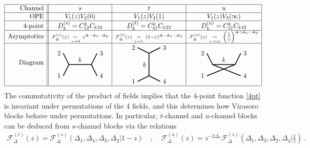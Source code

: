 \documentclass[12pt, a4paper]{article}
\begin{document}
\begin{align}
 \begin{array}{|r||c|c|c|}
  \hline 
  \text{Channel} & s & t & u
  \\ \hline
  \text{OPE} & V_1(z)V_2(0) & V_1(z)V_4(1) & V_1(z)V_3(\infty)
  \\ \hline 
  \text{4-point} & D^{(s)}_k = C_{12}^k C_{k34} & D^{(t)}_k = C_{41}^k C_{k23} & D^{(u)}_k = C_{31}^k C_{k42}
\\ \hline 
  \text{Asymptotics} & {\scriptstyle \mathcal{F}^{(s)}_{\Delta}(z)\ \underset{z\to 0}{\sim}\ z^{\Delta-\Delta_1-\Delta_2}} & {\scriptstyle\mathcal{F}^{(t)}_{\Delta}(z)\ \underset{z\to 1}{\sim}\ (1-z)^{\Delta-\Delta_1-\Delta_4}}
  & {\scriptstyle\mathcal{F}^{(u)}_\Delta(z)\  \underset{z\to \infty}{\sim}\ \left(\tfrac{1}{z}\right)^{\Delta+\Delta_1-\Delta_3}}
  \\
  \hline 
\text{Diagram} & 
\begin{tikzpicture}[baseline=(current  bounding  box.center), very thick, scale = .3]
\draw (-1,2) node [left] {$2$} -- (0,0) -- node [above] {$k$} (4,0) -- (5,2) node [right] {$3$};
\draw (-1,-2) node [left] {$1$} -- (0,0);
\draw (4,0) -- (5,-2) node [right] {$4$};
\end{tikzpicture}
& 
\begin{tikzpicture}[baseline=(current  bounding  box.center), very thick, scale = .3]
 \draw (-2,3) node [left] {$2$} -- (0,2) -- node [left] {$k$} (0,-2) -- (-2, -3) node [left] {$1$};
\draw (0,2) -- (2,3) node [right] {$3$};
\draw (0,-2) -- (2, -3) node [right] {$4$};
\end{tikzpicture}
& 
\begin{tikzpicture}[baseline=(current  bounding  box.center), very thick, scale = .3]
\draw (-1,2) node [left] {$2$} -- (0,0) -- node [above] {$k$} (4,0) -- (5,2) node [right] {$3$};
\draw (-1,-2) node [left] {$1$} -- (4,0);
\draw (0,0) -- (5,-2) node [right] {$4$};
\end{tikzpicture}
  \\
  \hline 
 \end{array}
 \label{stu}
\end{align}
The commutativity of the product of fields implies that the 4-point function \eqref{4pt} is invariant under permutations of the 4 fields, and this determines how Virasoro blocks behave under permutations. In particular, $t$-channel and $u$-channel blocks can be deduced from $s$-channel blocks via the relations 
\begin{align}
 \mathcal{F}^{(t)}_\Delta(z) = \mathcal{F}^{(s)}_\Delta(\Delta_1,\Delta_4,\Delta_3,\Delta_2|1-z) \quad , \quad 
 \mathcal{F}^{(u)}_\Delta(z) = z^{-2\Delta_1}\mathcal{F}^{(s)}_\Delta(\Delta_1,\Delta_3,\Delta_2,\Delta_4|\tfrac{1}{z})\ .
 \label{stotu}
\end{align}
\end{document}
